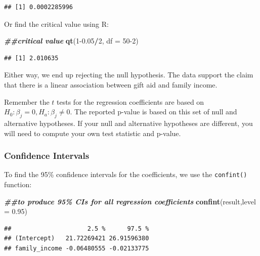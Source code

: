 \documentclass[
]{book}
\newenvironment{Shaded}{\begin{snugshade}}{\end{snugshade}}
\newcommand{\AttributeTok}[1]{\textcolor[rgb]{0.13,0.29,0.53}{#1}}
\newcommand{\DecValTok}[1]{\textcolor[rgb]{0.00,0.00,0.81}{#1}}
\newcommand{\DocumentationTok}[1]{\textcolor[rgb]{0.56,0.35,0.01}{\textbf{\textit{#1}}}}
\newcommand{\FloatTok}[1]{\textcolor[rgb]{0.00,0.00,0.81}{#1}}
\newcommand{\FunctionTok}[1]{\textcolor[rgb]{0.13,0.29,0.53}{\textbf{#1}}}
\newcommand{\NormalTok}[1]{#1}
\newcommand{\SpecialCharTok}[1]{\textcolor[rgb]{0.81,0.36,0.00}{\textbf{#1}}}
\begin{document}
\begin{verbatim}
## [1] 0.0002285996
\end{verbatim}

Or find the critical value using R:

\begin{Shaded}
\begin{Highlighting}[]
\DocumentationTok{\#\#critical value}
\FunctionTok{qt}\NormalTok{(}\DecValTok{1}\FloatTok{{-}0.05}\SpecialCharTok{/}\DecValTok{2}\NormalTok{, }\AttributeTok{df =} \DecValTok{50{-}2}\NormalTok{)}
\end{Highlighting}
\end{Shaded}

\begin{verbatim}
## [1] 2.010635
\end{verbatim}

Either way, we end up rejecting the null hypothesis. The data support the claim that there is a linear association between gift aid and family income.

Remember the \(t\) tests for the regression coefficients are based on \(H_0: \beta_j = 0, H_a: \beta_j \neq 0\). The reported p-value is based on this set of null and alternative hypotheses. If your null and alternative hypotheses are different, you will need to compute your own test statistic and p-value.

\subsubsection*{Confidence Intervals}\label{confidence-intervals-1}

To find the 95\% confidence intervals for the coefficients, we use the \texttt{confint()} function:

\begin{Shaded}
\begin{Highlighting}[]
\DocumentationTok{\#\#to produce 95\% CIs for all regression coefficients}
\FunctionTok{confint}\NormalTok{(result,}\AttributeTok{level =} \FloatTok{0.95}\NormalTok{)}
\end{Highlighting}
\end{Shaded}

\begin{verbatim}
##                     2.5 %      97.5 %
## (Intercept)   21.72269421 26.91596380
## family_income -0.06480555 -0.02133775
\end{verbatim}
\end{document}
